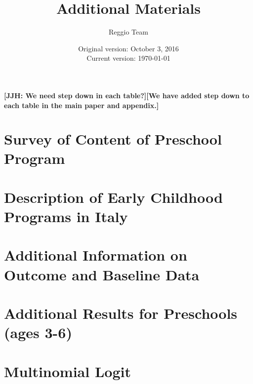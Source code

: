 

\setcounter{table}{0}
\renewcommand{\thetable}{A\arabic{table}}
\setcounter{figure}{0}
\renewcommand{\thefigure}{A\arabic{figure}}





\title{\Large \textbf{Additional Materials}}
\author{\normalsize Reggio Team}
\date{\normalsize Original version: October 3, 2016 \\ Current version: \today}
\maketitle

\textbf{[JJH: We need step down in each table?][We have added step down to each table in the main paper and appendix.]}

\tableofcontents

\doublespacing

\begin{appendices}

\section{Survey of Content of Preschool Program}
\label{sec:survey}


\section{Description of Early Childhood Programs in Italy}
\label{sec:programdes}


\section{Additional Information on Outcome and Baseline Data}
\label{sec:data-app}


\section{Additional Results for Preschools (ages 3-6)}
\label{sec:results}


\section{Multinomial Logit}
\label{sec:multi-logit}

\clearpage

\end{appendices}





